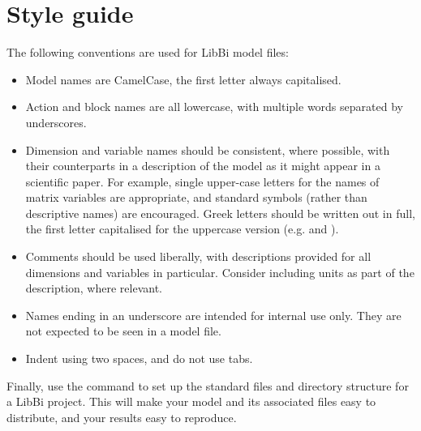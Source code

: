\section{Style guide\label{Style_guide}}

The following conventions are used for LibBi model files:
\begin{itemize}
\item Model names are CamelCase, the first letter always capitalised.
\item Action and block names are all lowercase, with multiple words separated
  by underscores.
\item Dimension and variable names should be consistent, where possible, with
  their counterparts in a description of the model as it might appear in a
  scientific paper. For example, single upper-case letters for the names of
  matrix variables are appropriate, and standard symbols (rather
  than descriptive names) are encouraged. Greek letters should be written out
  in full, the first letter capitalised for the uppercase version
  (e.g.  and ).
\item Comments should be used liberally, with descriptions provided for all
  dimensions and variables in particular. Consider including units as part of
  the description, where relevant.
\item Names ending in an underscore are intended for internal use only. They
  are not expected to be seen in a model file.
\item Indent using two spaces, and do not use tabs.
\end{itemize}

Finally, use the  command to set up the standard files and
directory structure for a LibBi project. This will make your model and its
associated files easy to distribute, and your results easy to reproduce.
